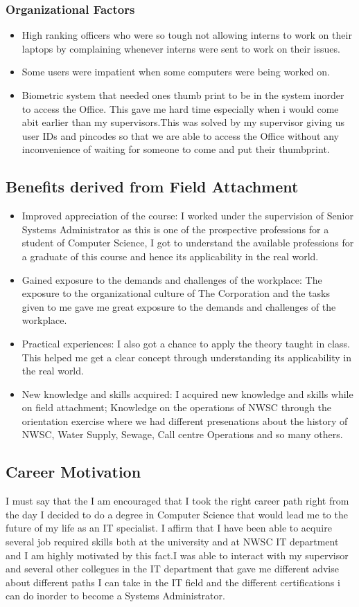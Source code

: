 \documentclass{article}
\begin{document}
\subsubsection{Organizational Factors}
\begin{itemize}
\item High ranking officers who were so tough not allowing interns to work on their laptops by complaining whenever interns were sent to work on their issues.
\item Some users were impatient when some computers were being worked on.
\item Biometric system that needed ones thumb print to be in the system inorder to access the Office. This gave me hard time especially when i would come abit earlier than my supervisors.This was solved by my supervisor giving us user IDs and pincodes so that we are able to access the Office without any inconvenience of waiting for someone to come and put their thumbprint.
\end{itemize}
\subsection{Benefits derived from Field Attachment}
\begin{itemize}
\item Improved appreciation of the course: I worked under the supervision of Senior Systems Administrator as this is one of the prospective professions for a student of Computer Science, I got to understand the available professions for a graduate of this course and hence its applicability in the real world.
\item Gained exposure to the demands and challenges of the workplace: The exposure to the organizational culture of The Corporation and the tasks given to me gave me great exposure to the demands and challenges of the workplace.
\item Practical experiences: I also got a chance to apply the theory taught in class. This helped me get a clear concept through understanding its applicability in the real world.
\item New knowledge and skills acquired: I acquired new knowledge and skills while on field attachment; Knowledge on the operations of NWSC through the orientation exercise where we had different presenations about the history of NWSC, Water Supply, Sewage, Call centre Operations and so many others.
\end{itemize}
\subsection{Career Motivation}
I must say that the I am encouraged that I took the right career path right from the day I decided to do  a degree in Computer Science that would lead me to the future of my life as an IT specialist. I affirm that I have been able to acquire several job
required skills both at the university and at NWSC IT department  and I am highly motivated by this
fact.I was able to interact with my supervisor and several other collegues in the IT department that gave me different advise about different paths I can take in the IT field and the different certifications i can do inorder to become a Systems Administrator.
\newpage
\end{document}
